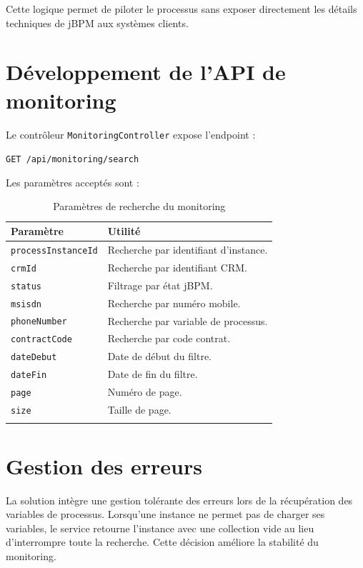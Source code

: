\documentclass[12pt,a4paper]{report}
\begin{document}
Cette logique permet de piloter le processus sans exposer directement les détails techniques de jBPM aux systèmes clients.

\section{Développement de l'API de monitoring}
Le contrôleur \texttt{MonitoringController} expose l'endpoint :
\begin{center}
\texttt{GET /api/monitoring/search}
\end{center}

Les paramètres acceptés sont :
\begin{longtable}{p{4cm}p{9cm}}
    \toprule
    \textbf{Paramètre} & \textbf{Utilité} \\
    \midrule
    \endhead
    \texttt{processInstanceId} & Recherche par identifiant d'instance. \\
    \texttt{crmId} & Recherche par identifiant CRM. \\
    \texttt{status} & Filtrage par état jBPM. \\
    \texttt{msisdn} & Recherche par numéro mobile. \\
    \texttt{phoneNumber} & Recherche par variable de processus. \\
    \texttt{contractCode} & Recherche par code contrat. \\
    \texttt{dateDebut} & Date de début du filtre. \\
    \texttt{dateFin} & Date de fin du filtre. \\
    \texttt{page} & Numéro de page. \\
    \texttt{size} & Taille de page. \\
    \bottomrule
    \caption{Paramètres de recherche du monitoring}
\end{longtable}

\section{Gestion des erreurs}
La solution intègre une gestion tolérante des erreurs lors de la récupération des variables de processus. Lorsqu'une instance ne permet pas de charger ses variables, le service retourne l'instance avec une collection vide au lieu d'interrompre toute la recherche. Cette décision améliore la stabilité du monitoring.
\end{document}
